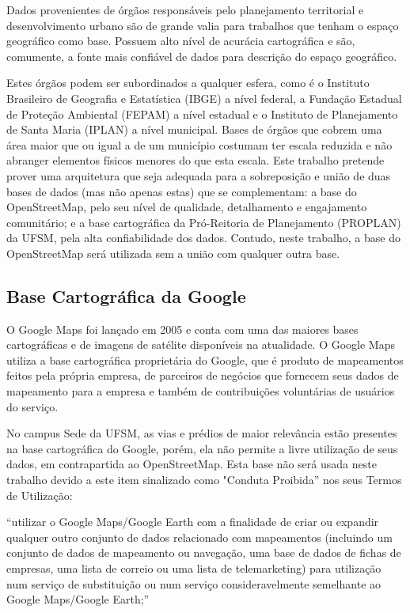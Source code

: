 \documentclass[oneside,openright,12pt]{ufsm_2015} %
\begin{document}
Dados provenientes de órgãos responsáveis pelo planejamento territorial e desenvolvimento urbano são de grande valia para trabalhos que tenham o espaço geográfico como base. Possuem alto nível de acurácia cartográfica e são, comumente, a fonte mais confiável de dados para descrição do espaço geográfico.

Estes órgãos podem ser subordinados a qualquer esfera, como é o Instituto Brasileiro de Geografia e Estatística (IBGE) a nível federal, a Fundação Estadual de Proteção Ambiental (FEPAM) a nível estadual e o Instituto de Planejamento de Santa Maria (IPLAN) a nível municipal. 
Bases de órgãos que cobrem uma área maior que ou igual a de um município costumam ter escala reduzida e não abranger elementos físicos menores do que esta escala. 
Este trabalho pretende prover uma arquitetura que seja adequada para a sobreposição e união de duas bases de dados (mas não apenas estas) que se complementam: a base do OpenStreetMap, pelo seu nível de qualidade, detalhamento e engajamento comunitário; e a base cartográfica da Pró-Reitoria de Planejamento (PROPLAN) da UFSM, pela alta confiabilidade dos dados. 
Contudo, neste trabalho, a base do OpenStreetMap será utilizada sem a união com qualquer outra base.

\subsection{Base Cartográfica da Google}
O Google Maps foi lançado em 2005 e conta com uma das maiores bases cartográficas e de imagens de satélite disponíveis na atualidade.
O Google Maps utiliza a base cartográfica proprietária do Google, que é produto de mapeamentos feitos pela própria empresa, de parceiros de negócios que fornecem seus dados de mapeamento para a empresa e também de contribuições voluntárias de usuários do serviço. 

No campus Sede da UFSM, as vias e prédios de maior relevância estão presentes na base cartográfica do Google, porém, ela não permite a livre utilização de seus dados, em contrapartida ao OpenStreetMap. 
Esta base não será usada neste trabalho devido a este item sinalizado como "Conduta Proibida'' nos seus Termos de Utilização:

``utilizar o Google Maps/Google Earth com a finalidade de criar ou expandir qualquer outro conjunto de dados relacionado com mapeamentos (incluindo um conjunto de dados de mapeamento ou navegação, uma base de dados de fichas de empresas, uma lista de correio ou uma lista de telemarketing) para utilização num serviço de substituição ou num serviço consideravelmente semelhante ao Google Maps/Google Earth;''   \cite{termosgoogle:2020}
\end{document}
